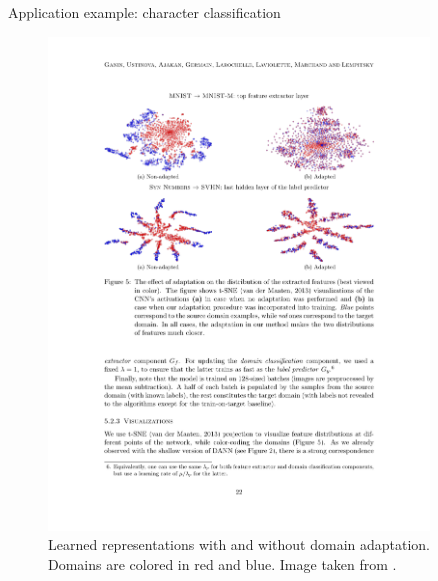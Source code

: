 \documentclass[xcolor=pdftex,dvipsnames,table]{beamer}
\begin{document}
\begin{frame}[noframenumbering]{Application example: character classification}
\begin{figure}[htb]
   \centering
   \includegraphics[width=0.9\textwidth]{../graphics/domain_adaptation_application_tsne.pdf}
   \caption{Learned representations with and without domain adaptation. Domains are colored in red and blue. Image taken from \cite{Ganin2016}.}
\end{figure}
\end{frame}

\end{document}

